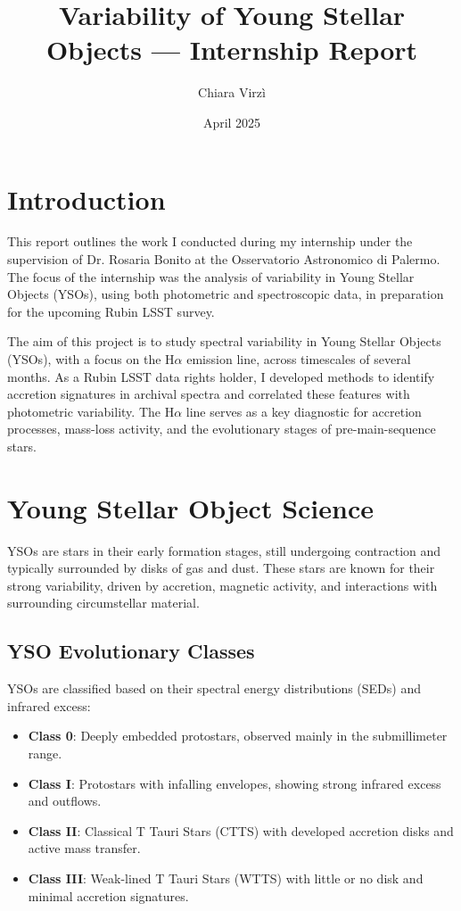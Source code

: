 \documentclass{article}
\title{Variability of Young Stellar Objects — Internship Report}
\author{Chiara Virzì}
\date{April 2025}
\begin{document}
\maketitle

\section{Introduction}
This report outlines the work I conducted during my internship under the supervision of Dr. Rosaria Bonito at the Osservatorio Astronomico di Palermo. The focus of the internship was the analysis of variability in Young Stellar Objects (YSOs), using both photometric and spectroscopic data, in preparation for the upcoming Rubin LSST survey.

The aim of this project is to study spectral variability in Young Stellar Objects (YSOs), with a focus on the H$\alpha$ emission line, across timescales of several months. As a Rubin LSST data rights holder, I developed methods to identify accretion signatures in archival spectra and correlated these features with photometric variability. The H$\alpha$ line serves as a key diagnostic for accretion processes, mass-loss activity, and the evolutionary stages of pre-main-sequence stars.

\section{Young Stellar Object Science}

YSOs are stars in their early formation stages, still undergoing contraction and typically surrounded by disks of gas and dust. These stars are known for their strong variability, driven by accretion, magnetic activity, and interactions with surrounding circumstellar material.

\subsection{YSO Evolutionary Classes}

YSOs are classified based on their spectral energy distributions (SEDs) and infrared excess:
\begin{itemize}
    \item \textbf{Class 0}: Deeply embedded protostars, observed mainly in the submillimeter range.
    \item \textbf{Class I}: Protostars with infalling envelopes, showing strong infrared excess and outflows.
    \item \textbf{Class II}: Classical T Tauri Stars (CTTS) with developed accretion disks and active mass transfer.
    \item \textbf{Class III}: Weak-lined T Tauri Stars (WTTS) with little or no disk and minimal accretion signatures.
\end{itemize}
\end{document}
